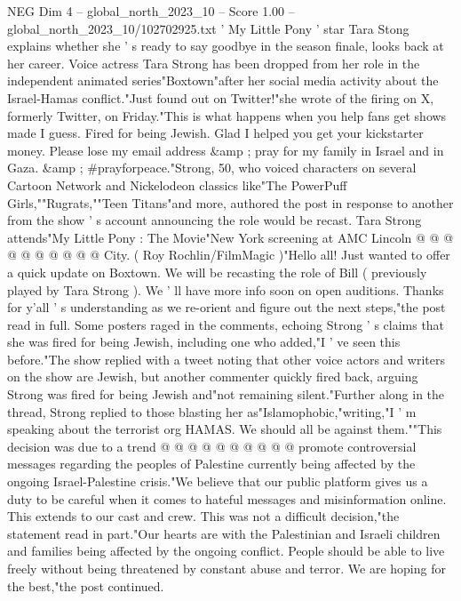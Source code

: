 \begin{textsample}{NEG Dim 4 – global\_north\_2023\_10 – Score 1.00 – global\_north\_2023\_10/102702925.txt}  \label{ex:f4_neg_016}
' My Little Pony ' star Tara Stong explains whether she ' s ready to say goodbye in the season finale, looks back at her career.
Voice actress Tara Strong has been dropped from her role in the independent animated series"Boxtown"after her social media activity about the Israel-Hamas conflict."Just found out on Twitter!"she wrote of the firing on X, formerly Twitter, on Friday."This is what happens when you help fans get shows made I guess.
Fired for being Jewish.
Glad I helped you get your kickstarter money.
Please lose my email address \&amp ; pray for my family in Israel and in Gaza. \&amp ; \#prayforpeace."Strong, 50, who voiced characters on several Cartoon Network and Nickelodeon classics like"The PowerPuff Girls,""Rugrats,""Teen Titans"and more, authored the post in response to another from the show ' s account announcing the role would be recast.
Tara Strong attends"My Little Pony : The Movie"New York screening at AMC Lincoln @ @ @ @ @ @ @ @ @ @ City. ( Roy Rochlin/FilmMagic )"Hello all!
Just wanted to offer a quick update on Boxtown.
We will be recasting the role of Bill ( previously played by Tara Strong ).
We ' ll have more info soon on open auditions.
Thanks for y'all ' s understanding as we re-orient and figure out the next steps,"the post read in full.
Some posters raged in the comments, echoing Strong ' s claims that she was fired for being Jewish, including one who added,"I ' ve seen this before."The show replied with a tweet noting that other voice actors and writers on the show are Jewish, but another commenter quickly fired back, arguing Strong was fired for being Jewish and"not remaining silent."Further along in the thread, Strong replied to those blasting her as"Islamophobic,"writing,"I ' m speaking about the terrorist org HAMAS.
We should all be against them.""This decision was due to a trend @ @ @ @ @ @ @ @ @ @ promote controversial messages regarding the peoples of Palestine currently being affected by the ongoing Israel-Palestine crisis."We believe that our public platform gives us a duty to be careful when it comes to hateful messages and misinformation online.
This extends to our cast and crew.
This was not a difficult decision,"the statement read in part."Our hearts are with the Palestinian and Israeli children and families being affected by the ongoing conflict.
People should be able to live freely without being threatened by constant abuse and terror.
We are hoping for the best,"the post continued.

\end{textsample}
